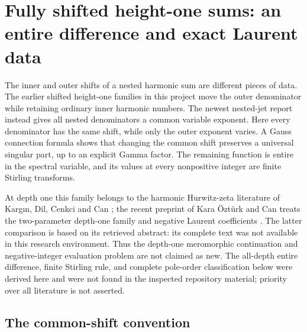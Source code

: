 \section{Fully shifted height-one sums: an entire difference and exact Laurent data}
\label{xid:hsh:sec:main}

The inner and outer shifts of a nested harmonic sum are different pieces
of data. The earlier shifted height-one families in this project move the
outer denominator while retaining ordinary inner harmonic numbers. The
newest nested-jet report instead gives all nested denominators a common
variable exponent. Here every denominator has the same shift, while only
the outer exponent varies. A Gauss connection formula shows that changing
the common shift preserves a universal singular part, up to an explicit
Gamma factor. The remaining function is entire in the spectral variable,
and its values at every nonpositive integer are finite Stirling transforms.

At depth one this family belongs to the harmonic Hurwitz-zeta literature
of Karg\i n, Dil, Cenkci and Can \cite{hsh:Kargin2023}; the recent preprint
of Kara \"Ozt\"urk and Can treats the two-parameter depth-one family and
negative Laurent coefficients \cite{hsh:KaraCan2026}. The latter comparison
is based on its retrieved abstract: its complete text was not available
in this research environment. Thus the depth-one meromorphic continuation
and negative-integer evaluation problem are not claimed as new. The
all-depth entire difference, finite Stirling rule, and complete pole-order
classification below were derived here and were not found in the
inspected repository material; priority over all literature is not asserted.

\subsection{The common-shift convention}

